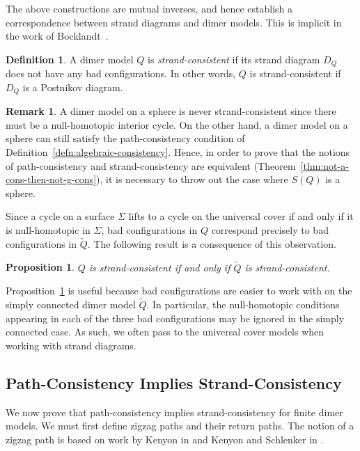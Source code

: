 \documentclass{article}
\newtheorem{prop}[thm]{Proposition}
\theoremstyle{definition}
\newtheorem{defn}[thm]{Definition}
\newtheorem{remk}[thm]{Remark}
\begin{document}
The above constructions are mutual inverses, and hence establish a correspondence between strand diagrams and dimer models. This is implicit in the work of Bocklandt~\cite{XBocklandt2015}. 



\begin{defn}
	A dimer model $Q$ is \textit{strand-consistent} if its strand diagram $D_Q$ does not have any bad configurations. In other words, $Q$ is strand-consistent if $D_Q$ is a Postnikov diagram.
\end{defn}

\begin{remk}\label{remk:alg-cons-no-sphere}
	A dimer model on a sphere is never strand-consistent since there must be a null-homotopic interior cycle.
	On the other hand, a dimer model on a sphere can still satisfy the path-consistency condition of Definition~\ref{defn:algebraic-consistency}. Hence, in order to prove that the notions of path-consistency and strand-consistency are equivalent (Theorem~\ref{thm:not-a-cons-then-not-g-cons}),
it is necessary to throw out the case where $S(Q)$ is a sphere. 
\end{remk}

Since a cycle on a surface $\Sigma$ lifts to a cycle on the universal cover if and only if it is null-homotopic in $\Sigma$, bad configurations in $Q$ correspond precisely to bad configurations in $\widetilde Q$. The following result is a consequence of this observation.

\begin{prop}\label{prop:Q-g-consistent-iff-hat-Q-g-consistent}
        $Q$ is strand-consistent if and only if $\widetilde Q$ is strand-consistent.
\end{prop}

Proposition~\ref{prop:Q-g-consistent-iff-hat-Q-g-consistent} is useful because bad configurations are easier to work with on the simply connected dimer model $\widetilde Q$. In particular, the null-homotopic conditions appearing in each of the three bad configurations may be ignored in the simply connected case.
As such, we often pass to the universal cover models when working with strand diagrams.

\subsection{Path-Consistency Implies Strand-Consistency}

We now prove that path-consistency implies strand-consistency for finite dimer models. We must first define zigzag paths and their return paths.  The notion of a zigzag path is based on work by Kenyon in \cite{Kenyon} and Kenyon and Schlenker in \cite{KenSch}.
\end{document}
